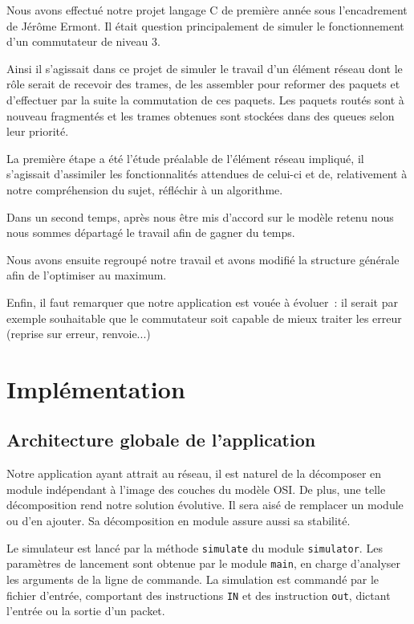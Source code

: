 \documentclass[a4paper,11pt]{article}
\begin{document}
Nous avons effectué notre projet langage C de première année sous l'encadrement de Jérôme Ermont. Il était question principalement de simuler le fonctionnement d'un commutateur de niveau 3. 

Ainsi il s'agissait dans ce projet de simuler le travail d'un élément réseau dont le rôle serait de recevoir des trames, de les assembler pour reformer des paquets et d'effectuer par la suite la commutation de ces paquets. Les paquets routés sont à nouveau fragmentés et les trames obtenues sont stockées dans des queues selon leur priorité.

La première étape a été l'étude préalable de l'élément réseau impliqué, il s'agissait d'assimiler les fonctionnalités attendues de celui-ci et de, relativement à notre compréhension du sujet, réfléchir à un algorithme.

Dans un second temps, après nous être mis d'accord sur le modèle retenu nous nous sommes départagé le travail afin de gagner du temps.  

Nous avons ensuite regroupé notre travail et avons modifié la structure générale afin de l'optimiser au maximum. 

Enfin, il faut remarquer que notre application est vouée à évoluer : il serait par exemple souhaitable que le commutateur soit capable de mieux traiter les erreur (reprise sur erreur, renvoie...)

\section{Implémentation}
\subsection{Architecture globale de l'application}

Notre application ayant attrait au réseau, il est naturel de la décomposer en module indépendant à l'image des couches du modèle OSI. De plus, une telle décomposition rend notre solution évolutive. Il sera aisé de remplacer un module ou d'en ajouter. Sa décomposition en module assure aussi sa stabilité.

Le simulateur est lancé par la méthode \texttt{simulate} du module \texttt{simulator}. Les paramètres de lancement sont obtenue par le module \texttt{main}, en charge d'analyser les arguments de la ligne de commande. La simulation est commandé par le fichier d'entrée, comportant des instructions \texttt{IN} et des instruction \texttt{out}, dictant l'entrée ou la sortie d'un packet.
\end{document}
